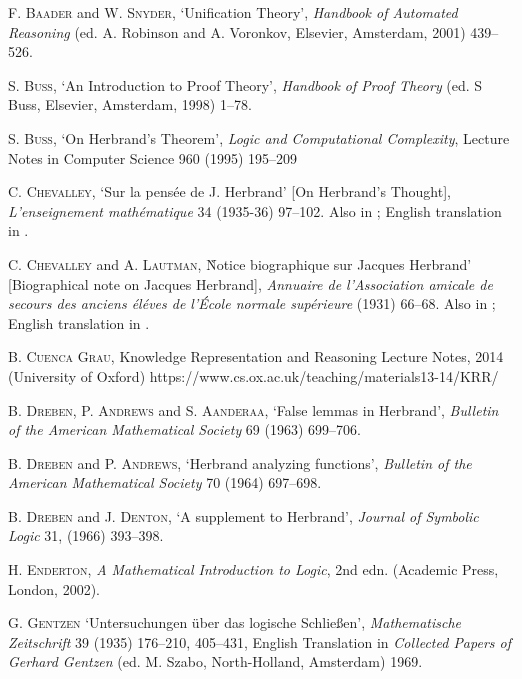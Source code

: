 \documentclass[a4paper,12pt]{report}
\theoremstyle{definition}
\begin{document}
\begin{thebibliography}{99}
\raggedright

\textsc{F. Baader} and \textsc{W. Snyder},
`Unification Theory',
\emph{Handbook of Automated Reasoning}
(ed. A. Robinson and A. Voronkov, Elsevier, Amsterdam, 2001)
439--526.

\textsc{S. Buss}, 
`An Introduction to Proof Theory',
\emph{Handbook of Proof Theory}
(ed. S Buss, Elsevier, Amsterdam, 1998)
1--78.

\textsc{S. Buss},
`On Herbrand's Theorem',
\emph{Logic and Computational Complexity},
Lecture Notes in Computer Science 960
(1995)
195--209

\textsc{C. Chevalley},
`Sur la pens\'e{e} de J. Herbrand' [On Herbrand's Thought],
\emph{L'enseignement math\'e{matique}} 34
(1935-36)
97--102.
Also in \cite{herb french}; English translation in \cite{herb english}.

\textsc{C. Chevalley} and \textsc{A. Lautman},
\`Notice biographique sur Jacques Herbrand' [Biographical note on Jacques Herbrand],
\emph{Annuaire de l'Association amicale de secours des anciens \'e{l}\'e{ves} de l'\'E{cole} normale sup\'e{rieure}}
(1931)
66--68.
Also in \cite{herb french}; English translation in \cite{herb english}.

\textsc{B. Cuenca Grau},
Knowledge Representation and Reasoning Lecture Notes,
2014
(University of Oxford)
https://www.cs.ox.ac.uk/teaching/materials13-14/KRR/

\textsc{B. Dreben, P. Andrews} and \textsc{S. Aanderaa},
`False lemmas in Herbrand',
\emph{Bulletin of the American Mathematical Society} 69
(1963)
699--706.

\textsc{B. Dreben} and \textsc{P. Andrews},
`Herbrand analyzing functions',
\emph{Bulletin of the American Mathematical Society} 70
(1964)
697--698.

\textsc{B. Dreben} and \textsc{J. Denton},
`A supplement to Herbrand',
\emph{Journal of Symbolic Logic} 31,
(1966)
393--398.

\textsc{H. Enderton},
\emph{A Mathematical Introduction to Logic}, 2nd edn.
(Academic Press, London, 2002).

\textsc{G. Gentzen}
`Untersuchungen \"u{ber} das logische Schlie\ss{en}',
\emph{Mathematische Zeitschrift} 39
(1935)
176--210, 405--431,
English Translation in \emph{Collected Papers of Gerhard Gentzen} (ed.  M. Szabo, North-Holland, Amsterdam) 1969.


\end{thebibliography}
\end{document}
